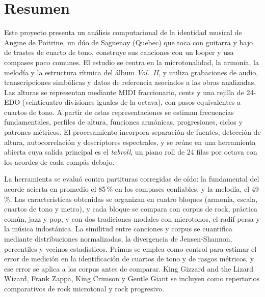 \chapter*{Resumen}

Este proyecto presenta un análisis computacional de la identidad musical de Angine de Poitrine, un dúo de Saguenay
(Quebec) que toca con guitarra y bajo de trastes de cuarto de tono, construye sus canciones con un looper y usa compases
poco comunes. El estudio se centra en la microtonalidad, la armonía, la melodía y la estructura rítmica del álbum
\emph{Vol.~II}, y utiliza grabaciones de audio, transcripciones simbólicas y datos de referencia asociados a las obras
analizadas. Las alturas se representan mediante MIDI fraccionario, cents y una rejilla de 24-EDO (veinticuatro divisiones
iguales de la octava), con pasos equivalentes a cuartos de tono. A partir de estas representaciones se estiman
frecuencias fundamentales, perfiles de altura, funciones armónicas, progresiones, ciclos y patrones métricos. El
procesamiento incorpora separación de fuentes, detección de altura, autocorrelación y descriptores espectrales, y se
reúne en una herramienta abierta cuya salida principal es el \emph{tabroll}, un piano roll de 24 filas por octava con
los acordes de cada compás debajo.

La herramienta se evaluó contra partituras corregidas de oído: la fundamental del acorde acierta en promedio el
85\,\% en los compases confiables, y la melodía, el 49\,\%. Las características obtenidas se organizan en cuatro bloques
(armonía, escala, cuartos de tono y metro), y cada bloque se compara con corpus de rock, práctica común, jazz y pop, y
con dos tradiciones modales con microtonos, el radif persa y la música indostánica. La similitud entre canciones y
corpus se cuantifica mediante distribuciones normalizadas, la divergencia de Jensen-Shannon, percentiles y vecinos
estadísticos. Primus se emplea como control para estimar el error de medición en la identificación de cuartos de tono y
de rasgos métricos, y ese error se aplica a los corpus antes de comparar. King Gizzard and the Lizard Wizard, Frank
Zappa, King Crimson y Gentle Giant se incluyen como repertorios comparativos de rock microtonal y rock progresivo.

